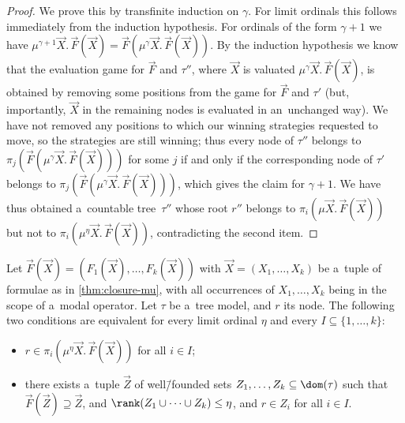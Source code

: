 \begin{proof}
	We prove this by transfinite induction on $\gamma$.
	For limit ordinals this follows immediately from the induction hypothesis.
	For ordinals of the form $\gamma+1$ we have $\mu^{\gamma+1}\vec{X}.\,\vec{F}(\vec{X})=\vec{F}(\mu^\gamma\vec{X}.\,\vec{F}(\vec{X}))$.
	By the induction hypothesis we know that the evaluation game for $\vec{F}$ and $\tau''$,
	where $\vec{X}$ is valuated $\mu^\gamma\vec{X}.\,\vec{F}(\vec{X})$, is obtained by removing some positions from the game for $\vec{F}$ and $\tau'$
	(but, importantly, $\vec{X}$ in the remaining nodes is evaluated in an~unchanged way).
	We have not removed any positions to which our winning strategies requested to move, so the strategies are still winning;
	thus every node of $\tau''$ belongs to $\pi_j(\vec{F}(\mu^\gamma\vec{X}.\,\vec{F}(\vec{X})))$ for some $j$
	if and only if the corresponding node of $\tau'$ belongs to $\pi_j(\vec{F}(\mu^\gamma\vec{X}.\,\vec{F}(\vec{X})))$, which gives the claim for $\gamma+1$.
	We have thus obtained a~countable tree~$\tau''$ whose root $r''$ belongs to $\pi_i(\mu\vec{X}.\,\vec{F}(\vec{X}))$ but not to $\pi_i(\mu^\eta\vec{X}.\,\vec{F}(\vec{X}))$, contradicting the second item.
\end{proof}

\begin{lem}\label{lem:mu-tree2}
	Let $\vec{F}(\vec{X})=(F_1(\vec{X}),\dots,F_k(\vec{X}))$ with $\vec{X}=(X_1,\dots,X_k)$ be a~tuple of formulae as in \cref{thm:closure-mu}, with all occurrences of $X_1,\dots,X_k$ being in the scope of a~modal operator.
	Let $\tau$ be a~tree model, and $r$ its node.
	The following two conditions are equivalent for every limit ordinal $\eta$ and every $I\subseteq\{1,\dots,k\}$:
	\begin{itemize}
	\item	$r\in\pi_i(\mu^\eta\vec{X}.\,\vec{F}(\vec{X}))$ for all $i\in I$;
	\item	there exists a~tuple $\vec{Z}$ of well\=/founded sets $Z_1,\dots,Z_k\subseteq\dom(\tau)$
		such that $\vec{F}(\vec{Z})\supseteq\vec{Z}$, and $\rank(Z_1\cup\dots\cup Z_k)\leq\eta$, and $r\in Z_i$ for all $i\in I$.
	\end{itemize}
\end{lem}

